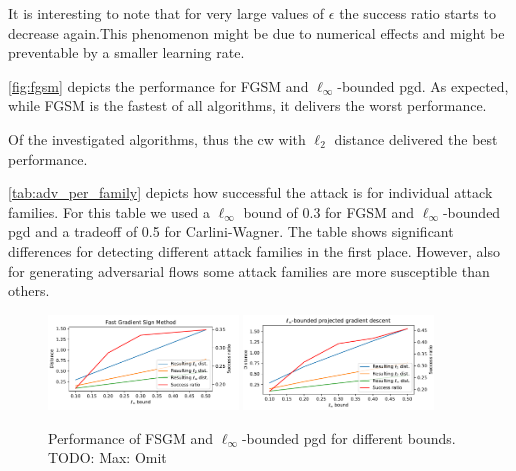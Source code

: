 \documentclass[conference]{IEEEtran}
\newcommand\note[2]{{\color{#1}#2}}
\newcommand\todo[1]{{\note{red}{TODO: #1}}}
\begin{document}
It is interesting to note that for very large values of $\epsilon$ the success ratio starts to decrease again.This phenomenon might be due to numerical effects and might be preventable by a smaller learning rate.


\autoref{fig:fgsm} depicts the performance for FGSM and $\ell_\infty$-bounded \gls{pgd}. As expected, while FGSM is the fastest of all algorithms, it delivers the worst performance.

Of the investigated algorithms, thus the \gls{cw} with $\ell_2$ distance delivered the best performance.

\autoref{tab:adv_per_family} depicts how successful the attack is for individual attack families. For this table we used a $\ell_\infty$ bound of 0.3 for FGSM and $\ell_\infty$-bounded \gls{pgd} and a tradeoff of 0.5 for Carlini-Wagner. The table shows significant differences for detecting different attack families in the first place. However, also for generating adversarial flows some attack families are more susceptible than others.

\begin{figure}
\includegraphics[width=0.45\textwidth]{adv_plots/fgsm.pdf}
\includegraphics[width=0.45\textwidth]{adv_plots/l_inf_pgd.pdf}
\caption{Performance of FSGM and $\ell_\infty$-bounded \gls{pgd} for different bounds.
\todo{Max: Omit}}
\label{fig:fgsm}
\end{figure}

%
%
\end{document}
